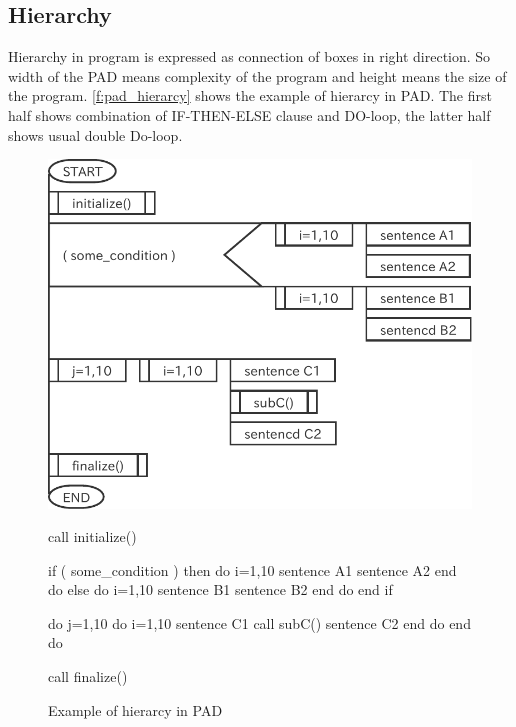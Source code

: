 \subsection{Hierarchy}

Hierarchy in program is expressed as connection of boxes in right
direction.
%
So width of the PAD means complexity of the program and height means the
size of the program.
%
\autoref{f:pad_hierarcy} shows the example of hierarcy in PAD.
%
The first half shows combination of IF-THEN-ELSE clause and DO-loop, the
latter half shows usual double Do-loop.

\begin{figure}[htbp]
\begin{minipage}{.7\textwidth}
 \center
  \includegraphics[scale=0.7]{figs/pad_hierarcy.pdf}
\end{minipage}
\begin{minipage}{.29\textwidth}
\begin{LstF90}[numbers=none]
 call initialize()

 if ( some_condition ) then
   do i=1,10
     sentence A1
     sentence A2
   end do
 else
   do i=1,10
     sentence B1
     sentence B2
   end do
 end if

 do j=1,10
   do i=1,10
     sentence C1
     call subC()
     sentence C2
   end do
 end do

 call finalize()
\end{LstF90}
\end{minipage}
\caption{Example of hierarcy in PAD}
\label{f:pad_hierarcy}
\end{figure}

